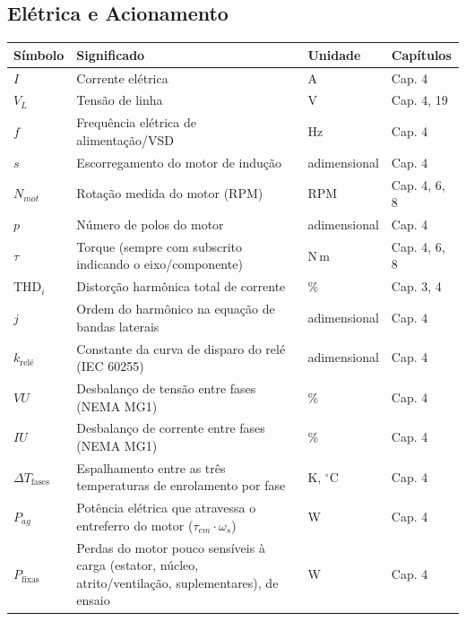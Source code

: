 \documentclass[12pt,a4paper]{article}
\numberwithin{equation}{section}
\numberwithin{table}{section}
\numberwithin{figure}{section}
\begin{document}
{\subsection*{Elétrica e Acionamento}
\begin{longtable}{>{\raggedright\arraybackslash}p{2.8cm} >{\raggedright\arraybackslash}p{5.3cm} >{\raggedright\arraybackslash}p{2.1cm} >{\raggedright\arraybackslash}p{4.2cm}}
	\toprule
	\textbf{Símbolo} & \textbf{Significado} & \textbf{Unidade} & \textbf{Capítulos} \\ \midrule
	\endhead
	$I$ & Corrente elétrica & A & Cap. 4 \\
	$V_L$ & Tensão de linha & V & Cap. 4, 19 \\
	$f$ & Frequência elétrica de alimentação/VSD & Hz & Cap. 4 \\
	$s$ & Escorregamento do motor de indução & adimensional & Cap. 4 \\
	$N_{mot}$\dag & Rotação medida do motor (RPM) & RPM & Cap. 4, 6, 8 \\
	$p$ & Número de polos do motor & adimensional & Cap. 4 \\
	$\tau$ & Torque (sempre com subscrito indicando o eixo/componente) & N\,m & Cap. 4, 6, 8 \\
	$\text{THD}_i$ & Distorção harmônica total de corrente & \% & Cap. 3, 4 \\
	$j$\dag & Ordem do harmônico na equação de bandas laterais & adimensional & Cap. 4 \\
	$k_{\text{relé}}$\dag & Constante da curva de disparo do relé (IEC 60255) & adimensional & Cap. 4 \\
	$VU$ & Desbalanço de tensão entre fases (NEMA MG1) & \% & Cap. 4 \\
	$IU$ & Desbalanço de corrente entre fases (NEMA MG1) & \% & Cap. 4 \\
	$\Delta T_{\text{fases}}$ & Espalhamento entre as três temperaturas de enrolamento por fase & K, $^{\circ}$C & Cap. 4 \\
	$P_{ag}$ & Potência elétrica que atravessa o entreferro do motor ($\tau_{em}\cdot\omega_s$) & W & Cap. 4 \\
	$P_{\text{fixas}}$ & Perdas do motor pouco sensíveis à carga (estator, núcleo, atrito/ventilação, suplementares), de ensaio & W & Cap. 4 \\ \bottomrule
\end{longtable}

}
\end{document}

